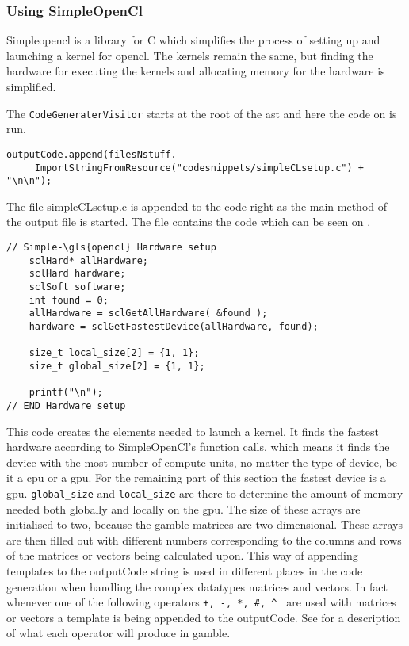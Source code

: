 \subsubsection*{Using SimpleOpenCl}
Simple\gls{opencl} is a library for C which simplifies the process of setting up and launching a kernel for \gls{opencl}.
The kernels remain the same, but finding the hardware for executing the kernels and allocating memory for the hardware is simplified.

The \texttt{CodeGeneraterVisitor} starts at the root of the \acrshort{ast} and here the code on  is run.

\begin{lstlisting}[caption=Call to setup Simple\gls{opencl} in the compiler by appending it to a string builder,numbers=none,frame=tlrb,label={lst:OpenCLSetup}]
outputCode.append(filesNstuff.
	 ImportStringFromResource("codesnippets/simpleCLsetup.c") + "\n\n");
\end{lstlisting}
The file simpleCLsetup.c is appended to the code right as the main method of the output file is started.
The file contains the code which can be seen on .

\begin{lstlisting}[caption=Simple\gls{opencl} setup in the compiler,numbers=none,frame=tlrb,label={lst:OpenCLSetup2}]
// Simple-\gls{opencl} Hardware setup
	sclHard* allHardware;
	sclHard hardware;
	sclSoft software;
	int found = 0;
	allHardware = sclGetAllHardware( &found );
	hardware = sclGetFastestDevice(allHardware, found);

    size_t local_size[2] = {1, 1};
    size_t global_size[2] = {1, 1}; 

    printf("\n");
// END Hardware setup
\end{lstlisting}

This code creates the elements needed to launch a kernel.
It finds the fastest hardware according to SimpleOpenCl's function calls, which means it finds the device with the most number of compute units, no matter the type of device, be it a \acrshort{cpu} or a \acrshort{gpu}.
For the remaining part of this section the fastest device is a \acrshort{gpu}.
\texttt{global\_size} and \texttt{local\_size} are there to determine the amount of memory needed both globally and locally on the \acrshort{gpu}.
The size of these arrays are initialised to two, because the \gls{gamble} matrices are two-dimensional.
These arrays are then filled out with different numbers corresponding to the columns and rows of the matrices or vectors being calculated upon.
This way of appending templates to the outputCode string is used in different places in the code generation when handling the complex datatypes matrices and vectors.
In fact whenever one of the following operators \texttt{+, -, *, \#, \^{} } are used with matrices or vectors a template is being appended to the outputCode. 
See  for a description of what each operator will produce in \gls{gamble}.

